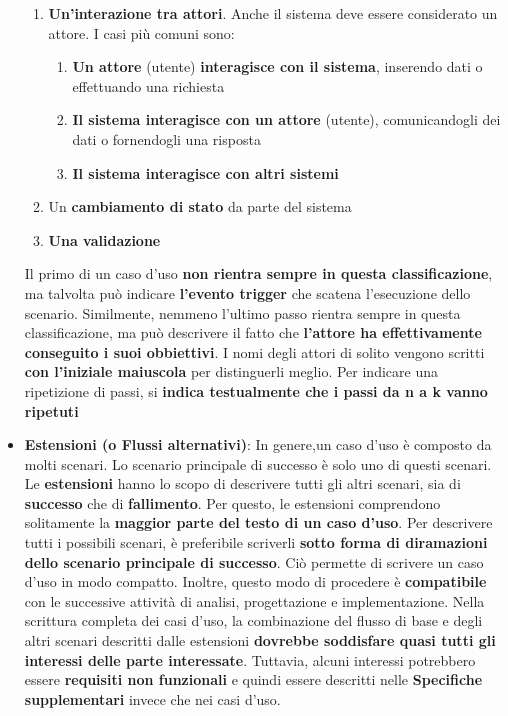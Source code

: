 \documentclass[12pt]{article}
\begin{document}
\begin{itemize}
\begin{enumerate}
        \item \textbf{Un'interazione tra attori}. Anche il sistema deve essere considerato un attore. I casi più comuni sono:
        \begin{enumerate}
            \item \textbf{Un attore} (utente) \textbf{interagisce con il sistema}, inserendo dati o effettuando una richiesta
            \item \textbf{Il sistema interagisce con un attore} (utente), comunicandogli dei dati o fornendogli una risposta
            \item \textbf{Il sistema interagisce con altri sistemi}
        \end{enumerate}
        \item Un \textbf{cambiamento di stato} da parte del sistema
        \item \textbf{Una validazione}
    \end{enumerate}  
    Il primo di un caso d'uso \textbf{non rientra sempre in questa classificazione}, ma talvolta può indicare \textbf{l'evento trigger} che scatena l'esecuzione dello scenario.
    Similmente, nemmeno l'ultimo passo rientra sempre in questa classificazione, ma può descrivere il fatto che \textbf{l'attore ha effettivamente conseguito i suoi obbiettivi}.
    I nomi degli attori di solito vengono scritti \textbf{con l'iniziale maiuscola} per distinguerli meglio.
    Per indicare una ripetizione di passi, si \textbf{indica testualmente che i passi da n a k vanno ripetuti}
    \item \textbf{Estensioni (o Flussi alternativi)}: In genere,un caso d'uso è composto da molti scenari. Lo scenario principale di successo è solo uno di questi scenari.
    Le \textbf{estensioni} hanno lo scopo di descrivere tutti gli altri scenari, sia di \textbf{successo} che di \textbf{fallimento}.
    Per questo, le estensioni comprendono solitamente la \textbf{maggior parte del testo di un caso d'uso}.
    Per descrivere tutti i possibili scenari, è preferibile scriverli \textbf{sotto forma di diramazioni dello scenario principale di successo}. Ciò permette di scrivere un caso d'uso in modo compatto.
    Inoltre, questo modo di procedere è \textbf{compatibile} con le successive attività di analisi, progettazione e implementazione.
    Nella scrittura completa dei casi d'uso, la combinazione del flusso di base e degli altri scenari descritti dalle estensioni \textbf{dovrebbe soddisfare quasi tutti gli interessi delle parte interessate}.
    Tuttavia, alcuni interessi potrebbero essere \textbf{requisiti non funzionali} e quindi essere descritti nelle \textbf{Specifiche supplementari} invece che nei casi d'uso.

\end{itemize}
\end{document}
